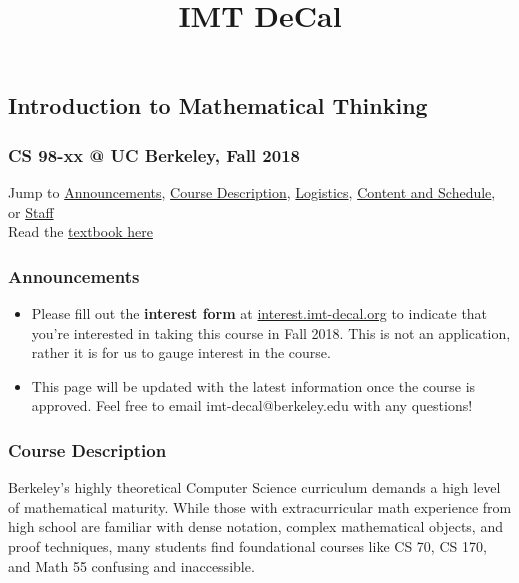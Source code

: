 \documentclass[]{article}
\title{IMT DeCal}
\date{}
\providecommand{\tightlist}{%
  \setlength{\itemsep}{0pt}\setlength{\parskip}{0pt}}
\begin{document}
\maketitle

\hypertarget{introduction-to-mathematical-thinking}{%
\subsection{Introduction to Mathematical
Thinking}\label{introduction-to-mathematical-thinking}}

\hypertarget{cs-98-xx-uc-berkeley-fall-2018}{%
\subsubsection{CS 98-xx @ UC Berkeley, Fall
2018}\label{cs-98-xx-uc-berkeley-fall-2018}}

Jump to \protect\hyperlink{announcements}{Announcements},
\protect\hyperlink{description}{Course Description},
\protect\hyperlink{logistics}{Logistics},
\protect\hyperlink{schedule}{Content and Schedule}, or
\protect\hyperlink{staff}{Staff}\\
Read the \href{http://book.imt-decal.org}{textbook here}

\hypertarget{announcements}{%
\subsubsection{Announcements}\label{announcements}}

\begin{itemize}
\tightlist
\item
  Please fill out the \textbf{interest form} at
  \href{http://interest.imt-decal.org}{interest.imt-decal.org} to
  indicate that you're interested in taking this course in Fall 2018.
  This is not an application, rather it is for us to gauge interest in
  the course.
\item
  This page will be updated with the latest information once the course
  is approved. Feel free to email {imt-decal@berkeley.edu} with any
  questions!
\end{itemize}

\hypertarget{description}{%
\subsubsection{Course Description}\label{description}}

Berkeley's highly theoretical Computer Science curriculum demands a high
level of mathematical maturity. While those with extracurricular math
experience from high school are familiar with dense notation, complex
mathematical objects, and proof techniques, many students find
foundational courses like CS 70, CS 170, and Math 55 confusing and
inaccessible.
\end{document}
